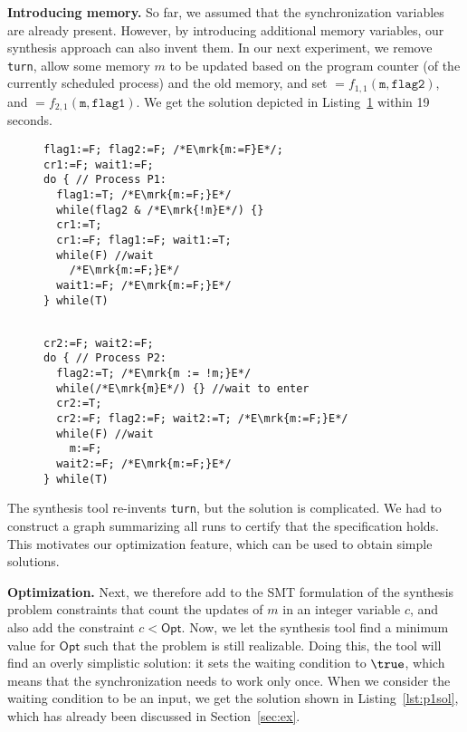 \textbf{Introducing memory.}
So far, we assumed that the synchronization variables are already present. 
However, by introducing additional memory variables, our synthesis approach can 
also invent them. In our next experiment, we remove \texttt{turn}, allow some 
memory $m$ to be updated based on the program counter (of the currently 
scheduled process) and the old memory, and set 
$=f_{1,1}(\texttt{m}, \texttt{flag2})$, and 
$=f_{2,1}(\texttt{m}, \texttt{flag1})$.  We get the solution 
depicted in Listing~\ref{lst:p1solmem} within 19 seconds.
\begin{figure}[tb]
\label{lst:p1solmem}
\vspace{-0.4cm}
\begin{minipage}{0.44\textwidth}
\begin{lstlisting}[firstnumber=0]
                   flag1:=F; flag2:=F; /*E\mrk{m:=F}E*/;
cr1:=F; wait1:=F;
do { // Process P1:
  flag1:=T; /*E\mrk{m:=F;}E*/
  while(flag2 & /*E\mrk{!m}E*/) {}
  cr1:=T;
  cr1:=F; flag1:=F; wait1:=T;
  while(F) //wait
    /*E\mrk{m:=F;}E*/
  wait1:=F; /*E\mrk{m:=F;}E*/
} while(T)
\end{lstlisting}
\end{minipage}
\hspace{0.1cm}
\begin{minipage}{0.54\textwidth}
\begin{lstlisting}[firstnumber=20]

cr2:=F; wait2:=F;
do { // Process P2:
  flag2:=T; /*E\mrk{m := !m;}E*/
  while(/*E\mrk{m}E*/) {} //wait to enter
  cr2:=T;
  cr2:=F; flag2:=F; wait2:=T; /*E\mrk{m:=F;}E*/
  while(F) //wait
    m:=F;
  wait2:=F; /*E\mrk{m:=F;}E*/
} while(T)
\end{lstlisting}
\end{minipage}
\end{figure}
The synthesis tool re-invents \texttt{turn}, but the solution is
complicated.  We had to construct a graph summarizing all runs to certify that
the specification holds.  This motivates our optimization feature, which can
be used to obtain simple solutions.

\textbf{Optimization.}
Next, we therefore add to the SMT formulation of the synthesis problem
constraints that count the updates of $m$ in an integer variable $c$, and also
add the constraint $c < \mathsf{Opt}$.  Now, we let the synthesis tool find a
minimum value for $\mathsf{Opt}$ such that the problem is still realizable.
Doing this, the tool will find an overly simplistic solution: it sets the
waiting condition  to $\true$, which means that the
synchronization needs to work only once.  When we consider the waiting 
condition to be an
input, we get the solution shown in Listing~\ref{lst:p1sol}, which has already
been discussed in Section~\ref{sec:ex}.

